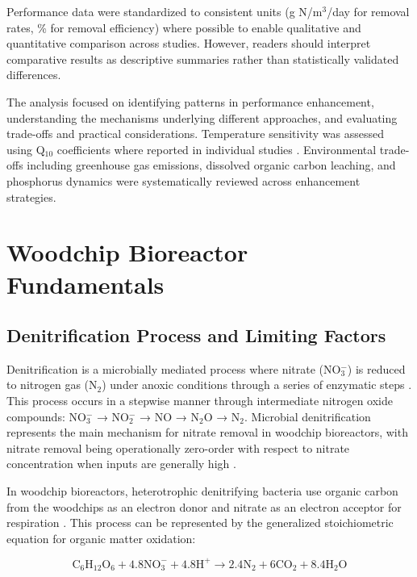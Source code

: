 \documentclass[12pt,a4paper]{article}
\begin{document}
Performance data were standardized to consistent units (g N/m$^3$/day for removal rates, \% for removal efficiency) where possible to enable qualitative and quantitative comparison across studies. However, readers should interpret comparative results as descriptive summaries rather than statistically validated differences.

The analysis focused on identifying patterns in performance enhancement, understanding the mechanisms underlying different approaches, and evaluating trade-offs and practical considerations. Temperature sensitivity was assessed using Q$_{10}$ coefficients where reported in individual studies \citep{RN242, RN258}. Environmental trade-offs including greenhouse gas emissions, dissolved organic carbon leaching, and phosphorus dynamics were systematically reviewed across enhancement strategies.

\section{Woodchip Bioreactor Fundamentals}

\subsection{Denitrification Process and Limiting Factors}

Denitrification is a microbially mediated process where nitrate (NO$_{3}^{-}$) is reduced to nitrogen gas (N$_{2}$) under anoxic conditions through a series of enzymatic steps \citep{RN242, RN629}. This process occurs in a stepwise manner through intermediate nitrogen oxide compounds: NO$_{3}^{-}$ → NO$_{2}^{-}$ → NO → N$_{2}$O → N$_{2}$. Microbial denitrification represents the main mechanism for nitrate removal in woodchip bioreactors, with nitrate removal being operationally zero-order with respect to nitrate concentration when inputs are generally high \citep{RN625, RN242}.

In woodchip bioreactors, heterotrophic denitrifying bacteria use organic carbon from the woodchips as an electron donor and nitrate as an electron acceptor for respiration \citep{RN242, RN725}. This process can be represented by the generalized stoichiometric equation for organic matter oxidation:

\begin{equation}
\text{C}_6\text{H}_{12}\text{O}_6 + 4.8\text{NO}_{3}^{-} + 4.8\text{H}^{+} \rightarrow 2.4\text{N}_{2} + 6\text{CO}_{2} + 8.4\text{H}_{2}\text{O}
\end{equation}
\end{document}

